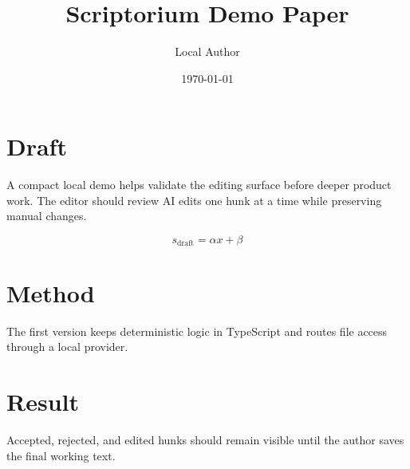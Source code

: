 \documentclass{article}
\title{Scriptorium Demo Paper}
\author{Local Author}
\date{\today}
\begin{document}
\maketitle

\section{Draft}

A compact local demo helps validate the editing surface before deeper product work.
The editor should review AI edits one hunk at a time while preserving manual changes.

\begin{equation}
s_{\mathrm{draft}} = \alpha x + \beta
\end{equation}

\section{Method}

The first version keeps deterministic logic in TypeScript and routes file access through a local provider.

\section{Result}

Accepted, rejected, and edited hunks should remain visible until the author saves the final working text.
\end{document}
